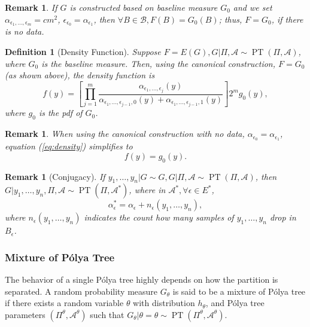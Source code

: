 \documentclass[12pt]{article}
\newtheorem{deff}[thm]{Definition}
\newtheorem{rmk}[thm]{Remark}
\newcommand{\polya}{P\'{o}lya}
\DeclareMathOperator{\pt}{PT}
\begin{document}
\begin{rmk}
  If $G$ is constructed based on baseline measure $G_0$ and we set
  $\alpha_{\epsilon_1, \ldots, \epsilon_m} = cm^2 $,
  $\epsilon_{\epsilon_0 }= \alpha_{\epsilon_1}$, then $\forall B \in
  \mathcal{B}, F(B) = G_0(B)$; thus, $F=G_0$, if there is no data.
\end{rmk}

\begin{deff}[Density Function]
  Suppose $F=E(G), G|\Pi, \mathcal{A} \sim \pt (\Pi, \mathcal{A})$,
  where $G_0 $ is the baseline measure. Then, using the canonical
  construction, $F=G_0$ (as shown above), the density function is
  \begin{equation}\label{eq:density}
    f(y) = \left[ \prod_{j=1}^m \frac{ \alpha_{\epsilon_1, \ldots,
          \epsilon_j}(y)}{\alpha_{\epsilon_1, \ldots, \epsilon_{j-1},0}(y)
        + \alpha_{\epsilon_1, \ldots, \epsilon_{j-1},1}(y)} \right] 2^{m } g_0(y),
  \end{equation}
  where $g_0$ is the pdf of $G_0$.
\end{deff}

\begin{rmk}
  When using the canonical construction with no data,
  $\alpha_{\epsilon_0 } = \alpha_{\epsilon_1}$, equation (\ref{eq:density})
  simplifies to
  \begin{displaymath}
    f(y) = g_0(y).
  \end{displaymath}
\end{rmk}

\begin{rmk}[Conjugacy] If $y_1, \ldots, y_n | G \sim G, G|\Pi,
  \mathcal{A} \sim \pt (\Pi, \mathcal{A})$, then $G|y_1, \ldots, y_n,
  \Pi, \mathcal{A} \sim \pt (\Pi, \mathcal{A}^{*})$, where in
  $\mathcal{A}^{*}, \forall \epsilon \in E^{*}$,
  \begin{displaymath}
    \alpha_{\epsilon}^{*} = \alpha_{\epsilon} + n_{\epsilon}(y_1, \ldots, y_n),
  \end{displaymath}
  where $n_{\epsilon}(y_1, \ldots, y_n)$ indicates the count how many
  samples of $y_1, \ldots, y_n$ drop in $B_{\epsilon}$.
\end{rmk}

\subsubsection{Mixture of \polya{} Tree}
The behavior of a single \polya{} tree highly depends on how the
partition is separated. A random probability measure $G_\theta$ is
said to be a mixture of \polya{} tree if there exists a random
variable $\theta$ with distribution $h_{\theta}$, and \polya{} tree
parameters $(\Pi^{\theta}, \mathcal{A}^{\theta})$ such that
$G_{\theta} | \theta=\theta \sim \pt (\Pi^{\theta},
\mathcal{A}^{\theta})$.
\end{document}
